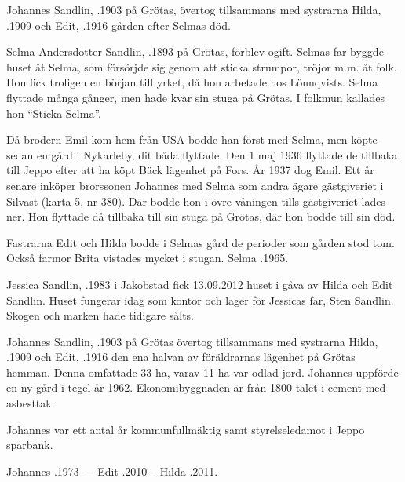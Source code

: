 Johannes Sandlin, .1903 på Grötas, övertog tillsammans med systrarna Hilda, .1909 och Edit, .1916 gården efter Selmas död.\jhvspace{}


Selma Andersdotter Sandlin, .1893 på Grötas, förblev ogift. Selmas far byggde huset åt Selma, som försörjde sig genom att sticka strumpor, tröjor m.m. åt folk. Hon fick troligen en början till yrket, då hon arbetade hos Lönnqvists. Selma flyttade många gånger, men hade kvar sin stuga på Grötas. I folkmun kallades hon ``Sticka-Selma''.

Då brodern Emil kom hem från USA bodde han först med Selma, men köpte sedan en gård i Nykarleby, dit båda flyttade. Den 1 maj 1936 flyttade de tillbaka till Jeppo efter att ha köpt Bäck lägenhet på Fors. År 1937 dog Emil. Ett år senare inköper brorssonen Johannes med Selma som andra ägare gästgiveriet i Silvast (karta 5, nr 380). Där bodde hon i övre våningen tills gästgiveriet lades ner. Hon flyttade då tillbaka till sin stuga på Grötas, där hon bodde till sin död.

Fastrarna Edit och Hilda bodde i Selmas gård de perioder som gården stod tom. Också farmor Brita vistades mycket i stugan. Selma .1965.






Jessica Sandlin, .1983 i Jakobstad fick 13.09.2012 huset i gåva av Hilda och Edit Sandlin. Huset fungerar idag som kontor och lager för Jessicas far, Sten Sandlin. Skogen och marken hade tidigare sålts.\jhvspace{}


Johannes Sandlin, .1903 på Grötas övertog tillsammans med systrarna Hilda, .1909 och Edit, .1916 den ena halvan av föräldrarnas lägenhet på Grötas hemman. Denna omfattade 33 ha, varav 11 ha var odlad jord. Johannes uppförde en ny gård i tegel år 1962. Ekonomibyggnaden är från 1800-talet i cement med asbesttak.

Johannes var ett antal år kommunfullmäktig samt styrelseledamot i Jeppo sparbank.

Johannes .1973  ---  Edit .2010  --  Hilda .2011.


